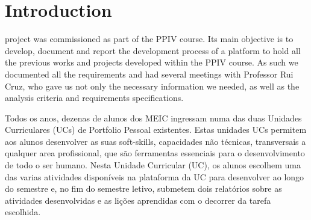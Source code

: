 \documentclass[a4paper,12pt,journal,twoside,compsoc]{PPIEEEtran}
\begin{document}

\maketitle

\IEEEdisplaynontitleabstractindextext
\IEEEpeerreviewmaketitle
\section{Introduction}
% 
% 
 project was commissioned as part of the PPIV course. Its main objective is to develop, document and report the development process of a platform to hold all the previous works and projects developed within the PPIV course. As such we documented all the requirements and had several meetings with Professor Rui Cruz, who gave us not only the necessary information we needed, as well as the analysis criteria and requirements specifications.

Todos os anos, dezenas de alunos dos \ac{MEIC} ingressam numa das duas Unidades Curriculares (UCs) de Portfolio Pessoal existentes. Estas unidades UCs permitem aos alunos desenvolver as suas soft-skills, capacidades não técnicas, transversais a qualquer area profissional, que são ferramentas essenciais para o desenvolvimento de todo o ser humano. Nesta Unidade Curricular (UC), os alunos escolhem uma das varias atividades disponíveis na plataforma da UC para desenvolver ao longo do semestre e, no fim do semestre letivo, submetem dois relatórios sobre as atividades desenvolvidas e as lições aprendidas com o decorrer da tarefa escolhida.
\end{document}
